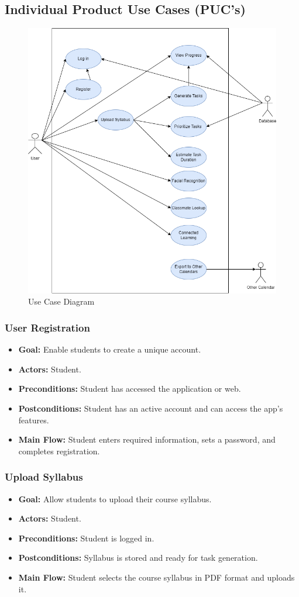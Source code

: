 \documentclass[12pt]{article}
\begin{document}
\subsection{Individual Product Use Cases (PUC’s)}
\begin{figure}[htbp]
    \centering
    \includegraphics[width=0.7\linewidth]{Use Case Diagram.drawio.png} 
    \caption{Use Case Diagram}
    \label{fig:samplelabel}
\end{figure}

\subsubsection{User Registration}
\begin{itemize}
    \item \textbf{Goal:} Enable students to create a unique account.
    \item \textbf{Actors:} Student.
    \item \textbf{Preconditions:} Student has accessed the application or web.
    \item \textbf{Postconditions:} Student has an active account and can access the app's features.
    \item \textbf{Main Flow:} Student enters required information, sets a password, and completes registration.
\end{itemize}

\subsubsection{Upload Syllabus}
\begin{itemize}
    \item \textbf{Goal:} Allow students to upload their course syllabus.
    \item \textbf{Actors:} Student.
    \item \textbf{Preconditions:} Student is logged in.
    \item \textbf{Postconditions:} Syllabus is stored and ready for task generation.
    \item \textbf{Main Flow:} Student selects the course syllabus in PDF format and uploads it.
\end{itemize}
\end{document}
